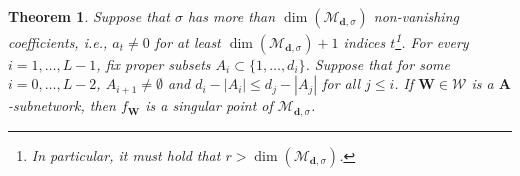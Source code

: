 \documentclass{article} %
\theoremstyle{plain}%
\newtheorem{thm}{Theorem}[section]
\theoremstyle{definition}
\theoremstyle{remark}
\begin{document}
\begin{thm}\label{thm:singular}
Suppose that $\sigma$ has more than $ \dim(\mathcal{M}_{\mathbf{d}, \sigma})  $ non-vanishing coefficients, i.e., $a_t \not = 0$ for at least $\dim(\mathcal{M}_{\mathbf{d}, \sigma}) + 1$ indices $t$\footnote{In particular, it must hold that $r > \dim(\mathcal{M}_{\mathbf{d}, \sigma}) $.}. 
For every $i=1, \ldots, L-1$, fix proper subsets $A_i \subset \{1, \ldots,  d_i \}$.  Suppose that for some $i = 0, \ldots, L-2$, $A_{i+1}\not = \emptyset$ and $d_i - |A_i| \leq d_j - |A_j|$ for all $j \leq i$. If $\mathbf{W} \in \mathcal{W}$ is a $\mathbf{A}$-subnetwork, then $f_\mathbf{W}$ is a singular point of $\mathcal{M}_{\mathbf{d}, \sigma}$. 
\end{thm}
\end{document}
